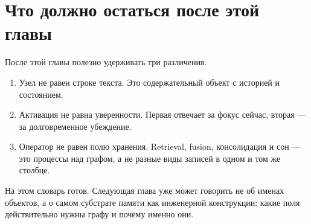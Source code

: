 \section{Что должно остаться после этой главы}

После этой главы полезно удерживать три различения.

\begin{enumerate}
\item Узел не равен строке текста. Это содержательный объект с историей и состоянием.
\item Активация не равна уверенности. Первая отвечает за фокус сейчас, вторая --- за долговременное убеждение.
\item Оператор не равен полю хранения. Retrieval, fusion, консолидация и сон --- это процессы над графом, а не разные виды записей в одном и том же столбце.
\end{enumerate}

На этом словарь готов. Следующая глава уже может говорить не об именах
объектов, а о самом субстрате памяти как инженерной конструкции: какие поля
действительно нужны графу и почему именно они.
